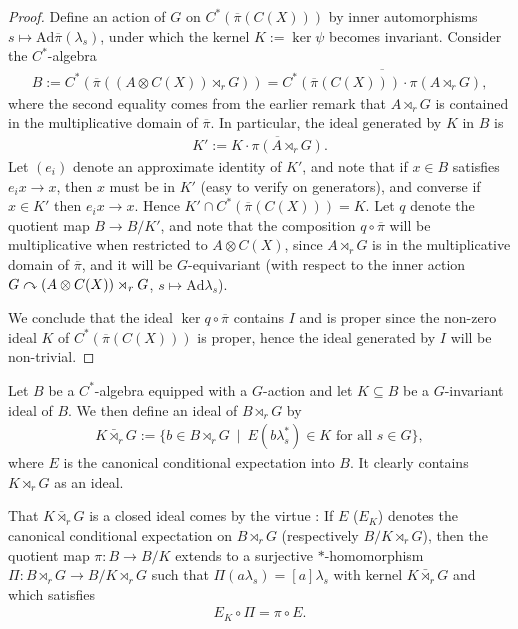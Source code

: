 \begin{proof}
	Define an action of $G$ on $C^*(\overline \pi(C(X)))$ by inner automorphisms $s \mapsto \mathrm{Ad} \overline \pi(\lambda_s)$, under which the kernel $K := \ker \psi$ becomes invariant. Consider the $C^*$-algebra 
	\begin{align*}
		B := C^*(\overline \pi ( ( A \otimes C(X)) \rtimes_r G)) = \overline{ C^*(\overline \pi(C(X))) \cdot \pi(A \rtimes_r G)},
	\end{align*}
	where the second equality comes from the earlier remark that $A \rtimes_r G$ is contained in the multiplicative domain of $\overline \pi$. In particular, the ideal generated by $K$ in $B$ is
	\begin{align*}
		K' :=\overline{K \cdot \pi(A \rtimes_r G)}.
	\end{align*}
	Let $(e_i)$ denote an approximate identity of $K'$, and note that if $x \in B$ satisfies $e_i x \to x$, then $x$ must be in $K'$ (easy to verify on generators), and converse if $x \in K'$ then $e_i x \to x$. Hence $K' \cap C^*(\overline \pi(C(X))) = K$. Let $q$ denote the quotient map $B \to B/K'$, and note that the composition $q \circ \overline \pi$ will be multiplicative when restricted to $A \otimes C(X)$, since $A \rtimes_r G$ is in the multiplicative domain of $\overline \pi$, and it will be $G$-equivariant (with respect to the inner action $G \stackrel{}{\curvearrowright} (A \otimes C(X))\rtimes_r G$, $s \mapsto \mathrm{Ad} \lambda_s$). 

	We conclude that the ideal $\ker q \circ \overline \pi$ contains $I$ and is proper since the non-zero ideal $K$ of $C^*(\overline \pi(C(X)))$ is proper, hence the ideal generated by $I$ will be non-trivial.
\end{proof}
\begin{definition}
	Let $B$ be a $C^*$-algebra equipped with a $G$-action and let $K \subseteq B$ be a $G$-invariant ideal of $B$. We then define an ideal  of $B \rtimes_r G$ by
	\begin{align*}
		K \bar \rtimes_r G := \{b \in B \rtimes_r G \ \mid \ E(b \lambda_s^* ) \in K \text{ for all } s \in G\},
	\end{align*}
	where $E$ is the canonical conditional expectation into $B$. It clearly contains $K \rtimes_r G$ as an ideal.
\end{definition}
\begin{remark}
	That $K \bar \rtimes_r G$ is a closed ideal comes by the virtue \cite[lemma 3.2]{hamana1979injective}: If $E$ ($E_K$) denotes the canonical conditional expectation on $B \rtimes_r G$ (respectively $B/K \rtimes_r G$), then the quotient map $\pi \colon B \to B/K$ extends to a surjective $*$-homomorphism $\Pi \colon B \rtimes_r G \to B/K \rtimes_r G$ such that $\Pi(a \lambda_s) = [a] \lambda_s$ with kernel $K \bar \rtimes_r G$ and which satisfies
	\begin{align*}
		E_K \circ \Pi =  \pi \circ E.
	\end{align*}
\end{remark}
